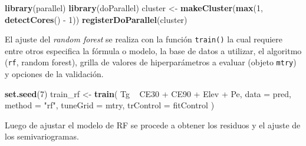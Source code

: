 \documentclass[11pt,b5paper,]{krantz}
\newenvironment{Shaded}{}{}
\newcommand{\KeywordTok}[1]{\textcolor[rgb]{0.00,0.44,0.13}{\textbf{#1}}}
\newcommand{\DataTypeTok}[1]{\textcolor[rgb]{0.56,0.13,0.00}{#1}}
\newcommand{\DecValTok}[1]{\textcolor[rgb]{0.25,0.63,0.44}{#1}}
\newcommand{\StringTok}[1]{\textcolor[rgb]{0.25,0.44,0.63}{#1}}
\newcommand{\OperatorTok}[1]{\textcolor[rgb]{0.40,0.40,0.40}{#1}}
\newcommand{\NormalTok}[1]{#1}
\begin{document}
\begin{Shaded}
\begin{Highlighting}[]
\KeywordTok{library}\NormalTok{(parallel)}
\KeywordTok{library}\NormalTok{(doParallel)}
\NormalTok{cluster <-}\StringTok{ }\KeywordTok{makeCluster}\NormalTok{(}\KeywordTok{max}\NormalTok{(}\DecValTok{1}\NormalTok{, }\KeywordTok{detectCores}\NormalTok{() }\OperatorTok{-}\StringTok{ }\DecValTok{1}\NormalTok{))}
\KeywordTok{registerDoParallel}\NormalTok{(cluster)}
\end{Highlighting}
\end{Shaded}

El ajuste del \emph{random forest} se realiza con la función
\texttt{train()} la cual requiere entre otros especifica la fórmula o
modelo, la base de datos a utilizar, el algoritmo (\texttt{rf}, random
forest), grilla de valores de hiperparámetros a evaluar (objeto
\texttt{mtry}) y opciones de la validación.

\begin{Shaded}
\begin{Highlighting}[]
\KeywordTok{set.seed}\NormalTok{(}\DecValTok{7}\NormalTok{)}
\NormalTok{train_rf <-}\StringTok{ }\KeywordTok{train}\NormalTok{(}
\NormalTok{  Tg }\OperatorTok{~}\StringTok{ }\NormalTok{CE30 }\OperatorTok{+}\StringTok{ }\NormalTok{CE90 }\OperatorTok{+}\StringTok{ }\NormalTok{Elev }\OperatorTok{+}\StringTok{ }\NormalTok{Pe,}
  \DataTypeTok{data =}\NormalTok{ pred,}
  \DataTypeTok{method =} \StringTok{"rf"}\NormalTok{,}
  \DataTypeTok{tuneGrid =}\NormalTok{ mtry,}
  \DataTypeTok{trControl =}\NormalTok{ fitControl}
\NormalTok{)}
\end{Highlighting}
\end{Shaded}

Luego de ajustar el modelo de RF se procede a obtener los residuos y el
ajuste de los semivariogramas.

\begin{Shaded}
\end{Shaded}
\end{document}

